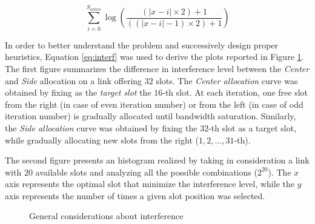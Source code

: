 \documentclass[9pt,twocolumn]{article}
\begin{document}
\begin{equation}
\label{eq:interf}
\sum_{i=0}^{S_{active}}\log\left(\frac{\left(|x-i|\times2\right)+1}{\left(\left(|x-i|-1\right)\times2\right)+1}\right)
\end{equation}

In order to better understand the problem and successively design proper heuristics, Equation \ref{eq:interf} was used to derive the plots reported in Figure \ref{fig:gen-diff}. The first figure summarizes the difference in interference level between the \emph{Center} and \emph{Side} allocation on a link offering $32$ slots. The \emph{Center allocation} curve was obtained by fixing as the \emph{target slot} the $16$-th slot. At each iteration, one free slot from the right (in case of even iteration number) or from the left (in case of odd iteration number) is gradually allocated until bandwidth saturation. Similarly, the \emph{Side allocation} curve was obtained by fixing the $32$-th slot as a target slot, while gradually allocating new slots from the right ($1, 2, \ldots, 31$-th).

The second figure presents an histogram realized by taking in consideration a link with $20$ available slots and analyzing all the possible combinations ($2^{20}$). The $x$ axis represents the optimal slot that minimize the interference level, while the $y$ axis represents the number of times a given slot position was selected.

\begin{figure}[!htb]
	\label{fig:gen-diff}
	\caption{General considerations about interference}
\end{figure}
\end{document}
